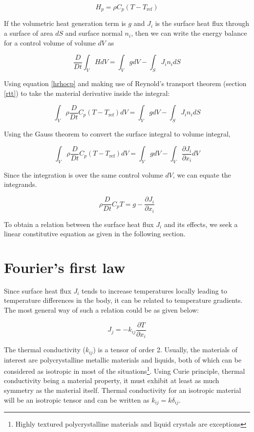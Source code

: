 \begin{equation}
H_p = \rho C_p (T - T_\text{ref})
\label{hrhocpa}
\end{equation}


If the volumetric heat generation term is $g$ and $J_i$ is the surface heat flux through a surface of area $dS$ and surface normal $n_i$, then we can write the energy balance for a control volume of volume $dV$ as

$$ \frac{D}{Dt} \int_V{H dV} = \int_{V}{g dV} - \int_{S}{ J_i n_i dS} $$

Using equation \ref{hrhocp} and making use of Reynold's transport theorem (section \ref{rtt}) to take the material derivative inside the integral: 

\begin{equation}
  \int_V{\rho \frac{D}{Dt} C_p (T - T_\text{ref}) dV} = \int_{V}{g dV} - \int_{S}{J_i n_i dS} 
\end{equation}

Using the Gauss theorem to convert the surface integral to volume integral,

\begin{equation}
  \int_V{\rho \frac{D}{Dt} C_p (T - T_\text{ref}) dV} = \int_{V}{g dV} - \int_{V}{\frac{\partial J_i}{\partial x_i} dV} 
\end{equation}


Since the integration is over the same control volume $dV$, we can equate the integrands.

\begin{equation}
\rho \frac{D}{Dt} C_p T = g - \frac{\partial J_i}{\partial x_i}
\label{ebalance}
\end{equation}

To obtain a relation between the surface heat flux $J_i$ and its effects, we seek a linear constitutive equation as given in the following section.

\section{Fourier's first law}

Since surface heat flux $J_i$ tends to increase temperatures locally leading to temperature differences in the body, it can be related to temperature gradients. The most general way of such a relation could be as given below:

$$ J_j = -k_{ij} \frac{\partial T}{\partial x_i} $$ 

The thermal conductivity ($k_{ij}$) is a tensor of order 2. Usually, the materials of interest are polycrystalline metallic materials and liquids, both of which can be considered as isotropic in most of the situations\footnote{Highly textured polycrystalline materials and liquid crystals are exceptions}. Using Curie principle, thermal conductivity being a material property, it must exhibit at least as much symmetry as the material itself. Thermal conductivity for an isotropic material will be an isotropic tensor and can be written as $k_{ij} = k \delta_{ij}$.

